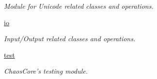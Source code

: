 \begin{DoxyCompactItemize}
\begin{DoxyCompactList}\small\item\em Module for Unicode related classes and operations. \end{DoxyCompactList}\item 
\hyperlink{namespacechaos_1_1io}{io}
\begin{DoxyCompactList}\small\item\em Input/\-Output related classes and operations. \end{DoxyCompactList}\item 
\hyperlink{namespacechaos_1_1test}{test}
\begin{DoxyCompactList}\small\item\em Chaos\-Core's testing module. \end{DoxyCompactList}\end{DoxyCompactItemize}
